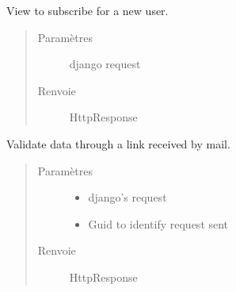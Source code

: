 \documentclass[letterpaper,10pt,french]{sphinxmanual}
\begin{document}

\begin{fulllineitems}
\label{\detokenize{accounts:accounts.views.subscribe}}
View to subscribe for a new user.
\begin{quote}\begin{description}
\item[{Paramètres}] \leavevmode
{} \textendash{} django request

\item[{Renvoie}] \leavevmode
HttpResponse

\end{description}\end{quote}

\end{fulllineitems}


\begin{fulllineitems}
\label{\detokenize{accounts:accounts.views.validate}}
Validate data through a link received by mail.
\begin{quote}\begin{description}
\item[{Paramètres}] \leavevmode\begin{itemize}
\item {}
 \textendash{} django’s request

\item {}
 \textendash{} Guid to identify request sent

\end{itemize}

\item[{Renvoie}] \leavevmode
HttpResponse

\end{description}\end{quote}

\end{fulllineitems}
\end{document}
